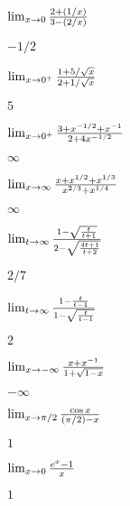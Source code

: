 \begin{exercises}
\begin{exercise} $\lim_{x\to 0}{2+(1/x)\over 3-(2/x)}$
\begin{answer} $-1/2$
\end{answer}\end{exercise}

\begin{exercise} $\lim_{x\to 0^+}{1+5/\sqrt{x}\over 2+1/\sqrt{x}}$
\begin{answer} $5$
\end{answer}\end{exercise}

\begin{exercise} $\lim_{x\to 0^+}{3+x^{-1/2}+x^{-1}\over 2+4x^{-1/2}}$
\begin{answer} $\infty$
\end{answer}\end{exercise}

\begin{exercise} $\lim_{x\to\infty}{x+x^{1/2}+x^{1/3}\over x^{2/3}+x^{1/4}}$
\begin{answer} $\infty$
\end{answer}\end{exercise}

\begin{exercise} $\lim_{t\to\infty}
{1-\sqrt{t\over t+1}\over 2-\sqrt{4t+1\over t+2}}$
\begin{answer} $2/7$
\end{answer}\end{exercise}

\begin{exercise} $\lim_{t\to\infty}{1-{t\over t-1}\over 1-\sqrt{t\over t-1}}$
\begin{answer} $2$
\end{answer}\end{exercise}

\begin{exercise} $\lim_{x\to-\infty}{x+x^{-1}\over 1+\sqrt{1-x}}$
\begin{answer} $-\infty$
\end{answer}\end{exercise}



\begin{exercise} $\lim_{x\to\pi/2}{\cos x\over (\pi/2)-x}$
\begin{answer} $1$
\end{answer}\end{exercise}

\begin{exercise} $\lim_{x\to0}{e^x-1\over x}$
\begin{answer} $1$
\end{answer}\end{exercise}


\end{exercises}
